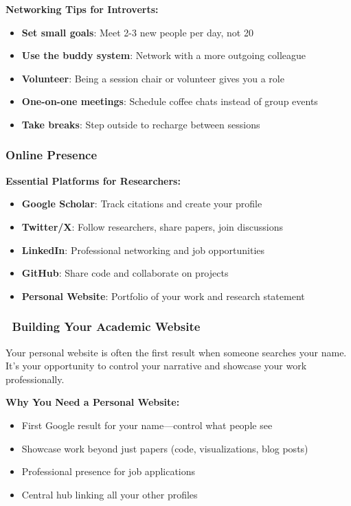 \documentclass[11pt,a4paper]{article}
\begin{document}
\textbf{Networking Tips for Introverts:}
\begin{itemize}
    \item \textbf{Set small goals}: Meet 2-3 new people per day, not 20
    \item \textbf{Use the buddy system}: Network with a more outgoing colleague
    \item \textbf{Volunteer}: Being a session chair or volunteer gives you a role
    \item \textbf{One-on-one meetings}: Schedule coffee chats instead of group events
    \item \textbf{Take breaks}: Step outside to recharge between sessions
\end{itemize}

\subsubsection{Online Presence}

\textbf{Essential Platforms for Researchers:}
\begin{itemize}
    \item \textbf{Google Scholar}: Track citations and create your profile
    \item \textbf{Twitter/X}: Follow researchers, share papers, join discussions
    \item \textbf{LinkedIn}: Professional networking and job opportunities
    \item \textbf{GitHub}: Share code and collaborate on projects
    \item \textbf{Personal Website}: Portfolio of your work and research statement
\end{itemize}

\subsubsection{\faGlobe~Building Your Academic Website}

\begin{tcolorbox}[colback=green!5,colframe=green!50,title=Your Digital Academic Identity]
Your personal website is often the first result when someone searches your name. It's your opportunity to control your narrative and showcase your work professionally.
\end{tcolorbox}

\textbf{Why You Need a Personal Website:}
\begin{itemize}
    \item First Google result for your name—control what people see
    \item Showcase work beyond just papers (code, visualizations, blog posts)
    \item Professional presence for job applications
    \item Central hub linking all your other profiles
\end{itemize}
\end{document}
